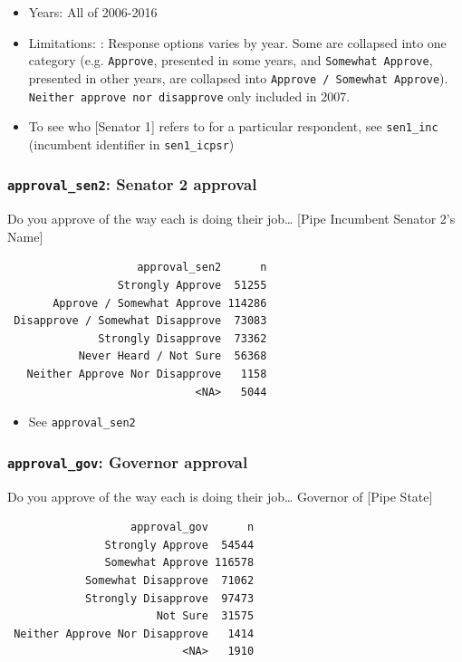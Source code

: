 \documentclass[10pt,article,oneside]{memoir}
\theoremstyle{definition}
\begin{document}
\begin{itemize}
\tightlist
\item
  Years: All of 2006-2016
\item
  Limitations: : Response options varies by year. Some are collapsed
  into one category (e.g. \texttt{Approve}, presented in some years, and
  \texttt{Somewhat\ Approve}, presented in other years, are collapsed
  into \texttt{Approve\ /\ Somewhat\ Approve}).
  \texttt{Neither\ approve\ nor\ disapprove} only included in 2007.
\item
  To see who {[}Senator 1{]} refers to for a particular respondent, see
  \texttt{sen1\_inc} (incumbent identifier in \texttt{sen1\_icpsr})
\end{itemize}

\subsubsection{\texorpdfstring{\texttt{approval\_sen2}: Senator 2
approval}{approval\_sen2: Senator 2 approval}}\label{approval_sen2-senator-2-approval}

Do you approve of the way each is doing their job\ldots{} {[}Pipe
Incumbent Senator 2's Name{]}

\begin{verbatim}
                    approval_sen2      n
                 Strongly Approve  51255
       Approve / Somewhat Approve 114286
 Disapprove / Somewhat Disapprove  73083
              Strongly Disapprove  73362
           Never Heard / Not Sure  56368
   Neither Approve Nor Disapprove   1158
                             <NA>   5044
\end{verbatim}

\begin{itemize}
\tightlist
\item
  See \texttt{approval\_sen2}
\end{itemize}

\subsubsection{\texorpdfstring{\texttt{approval\_gov}: Governor
approval}{approval\_gov: Governor approval}}\label{approval_gov-governor-approval}

Do you approve of the way each is doing their job\ldots{} Governor of
{[}Pipe State{]}

\begin{verbatim}
                   approval_gov      n
               Strongly Approve  54544
               Somewhat Approve 116578
            Somewhat Disapprove  71062
            Strongly Disapprove  97473
                       Not Sure  31575
 Neither Approve Nor Disapprove   1414
                           <NA>   1910
\end{verbatim}
\end{document}
